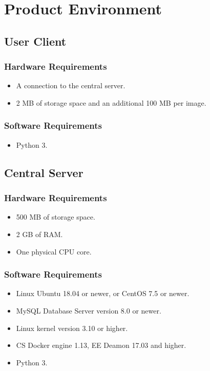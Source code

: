 \section{Product Environment}
  \subsection{User Client}
    \subsubsection{Hardware Requirements}
      \begin{itemize}
      \item A connection to the central server.
      \item 2 MB of storage space and an additional 100 MB per image.
      \end{itemize}
    \subsubsection{Software Requirements}
      \begin{itemize}
      \item Python 3.
    \end{itemize}

  \subsection{Central Server}
    \subsubsection{Hardware Requirements}  
    \begin{itemize}
      \item 500 MB of storage space.
      \item 2 GB of RAM.
      \item One physical CPU core.
    \end{itemize}
    \subsubsection{Software Requirements}  
    \begin{itemize}
      \item Linux Ubuntu 18.04 or newer, or CentOS 7.5 or newer.
      \item MySQL Database Server version 8.0 or newer.
      \item Linux kernel version 3.10 or higher.
      \item CS Docker engine 1.13, EE Deamon 17.03 and higher.
      \item Python 3.
    \end{itemize}

